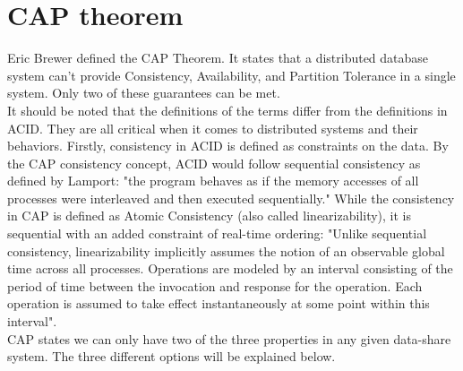 \documentclass[a4paper,10pt,titlepage]{report}
\begin{document}
    \section{CAP theorem}

    Eric Brewer defined the CAP Theorem\cite{CAP}. It states that a distributed database system can't provide Consistency, Availability, and Partition Tolerance in a single system. Only two of these guarantees can be met.\\
    \vspace{5mm}
    It should be noted that the definitions of the terms differ from the definitions in ACID. They are all critical when it comes to distributed systems and their behaviors. Firstly, consistency in ACID is defined as constraints on the data. By the CAP consistency concept, ACID would follow sequential consistency as defined by Lamport\cite{lamport1993how}: "the program behaves as if the memory accesses of all processes were interleaved and then executed sequentially." While the consistency in CAP is defined as Atomic Consistency (also called linearizability), it is sequential with an added constraint of real-time ordering: "Unlike sequential consistency, linearizability implicitly assumes the notion of an observable global time across all processes. Operations are modeled by an interval consisting of the period of time between the invocation and response for the operation. Each operation is assumed to take effect instantaneously at some point within this interval". \cite{CSL-TR-95-685} \\
    \vspace{5mm}
    CAP states we can only have two of the three properties in any given data-share system. The three different options will be explained below.
\end{document}
